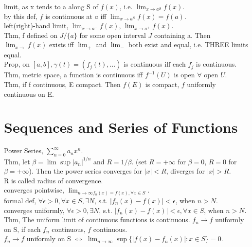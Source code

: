 \documentclass[paper=a4, fontsize=11pt]{scrartcl} %
\numberwithin{equation}{section} %
\numberwithin{figure}{section} %
\numberwithin{table}{section} %
\begin{document}
limit, as x tends to a along S of $f(x)$, i.e. $\lim_{x\rightarrow a^S} f(x)$.\\
by this def, $f$ is continuous at $a$ iff $\lim_{x\rightarrow a^S} f(x) = f(a)$.\\
left(right)-hand limit, $\lim_{x\rightarrow a^-} f(x)$, $\lim_{x\rightarrow a^+} f(x)$.\\
Thm, f defined on $J/\{a\}$ for some open interval $J$ containing a. Then $\lim_{x\rightarrow}f(x)$ exists iff $\lim_+$ and $\lim_-$ both exist and equal, i.e. THREE limits equal.\\
Prop, on $[a,b], $$\gamma(t) = (f_j(t),...)$ is continuous iff each $f_j$ is continuous.\\
Thm, metric space, a function is continuous iff $f^{-1}(U)$ is open $\forall $ open $U$.\\
Thm, if f continuous, E compact. Then $f(E)$ is compact, $f$ uniformly continuous on E. 

\section{Sequences and Series of Functions}
Power Series, $\sum_{n=0}^\infty a_n x^n$.\\
Thm, let $\beta= \lim\sup |a_n|^{1/n}$ and $R=1/\beta$. (set $R=+\infty$ for $\beta=0$, $R=0$ for $\beta=+\infty$). Then the power series converges for $|x|<R$, diverges for $|x|>R$.\\
R is called radius of convergence.\\
converges pointwise, $\lim_{n\rightarrow\infty f_n(x)=f(x), \forall x\in S}$.\\
formal def, $\forall \epsilon>0, \forall x\in S, \exists N$, s.t. $|f_n(x)-f(x)|<\epsilon$, when $n>N$.\\
converges uniformly, $\forall \epsilon>0, \exists N$, s.t. $|f_n(x)-f(x)|<\epsilon, \forall x\in S$, when $n>N$.\\
Thm, The uniform limit of continuous functions is continuous. $f_n\rightarrow f$ uniformly on S, if each $f_n$ continuous, $f$ continuous.\\
$f_n\rightarrow f$ uniformly on S  $\Leftrightarrow$ $\lim_{n\rightarrow\infty} \sup\{|f(x)-f_n(x)|:x\in S\} = 0$.
\end{document}
